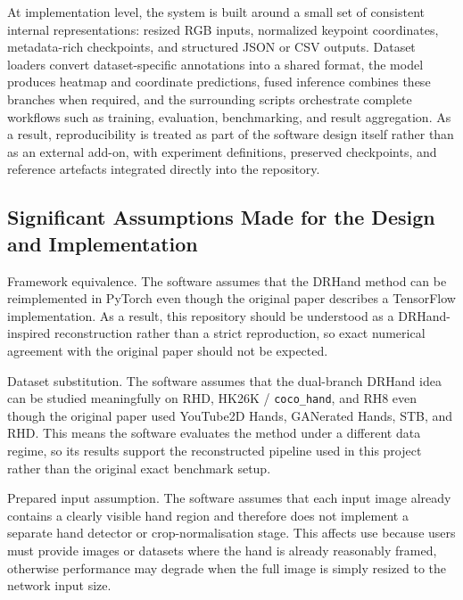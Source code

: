 ﻿\documentclass[11pt,a4paper]{article}
\begin{document}
\medskip

At implementation level, the system is built around a small set of consistent internal representations: resized RGB inputs, normalized keypoint coordinates, metadata-rich checkpoints, and structured JSON or CSV outputs. Dataset loaders convert dataset-specific annotations into a shared format, the model produces heatmap and coordinate predictions, fused inference combines these branches when required, and the surrounding scripts orchestrate complete workflows such as training, evaluation, benchmarking, and result aggregation. As a result, reproducibility is treated as part of the software design itself rather than as an external add-on, with experiment definitions, preserved checkpoints, and reference artefacts integrated directly into the repository.

\subsection{Significant Assumptions Made for the Design and Implementation}

Framework equivalence. The software assumes that the DRHand method can be reimplemented in PyTorch even though the original paper describes a TensorFlow implementation. As a result, this repository should be understood as a DRHand-inspired reconstruction rather than a strict reproduction, so exact numerical agreement with the original paper should not be expected.

\medskip

Dataset substitution. The software assumes that the dual-branch DRHand idea can be studied meaningfully on RHD, HK26K / \texttt{coco\_hand}, and RH8 even though the original paper used YouTube2D Hands, GANerated Hands, STB, and RHD. This means the software evaluates the method under a different data regime, so its results support the reconstructed pipeline used in this project rather than the original exact benchmark setup.

\medskip

Prepared input assumption. The software assumes that each input image already contains a clearly visible hand region and therefore does not implement a separate hand detector or crop-normalisation stage. This affects use because users must provide images or datasets where the hand is already reasonably framed, otherwise performance may degrade when the full image is simply resized to the network input size.

\medskip
\end{document}
